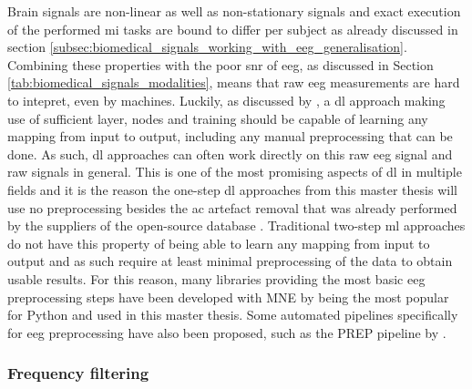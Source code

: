 Brain signals are non-linear as well as non-stationary signals and exact execution of the performed \gls{mi} tasks are bound to differ per subject as already discussed in section \ref{subsec:biomedical_signals_working_with_eeg_generalisation}.
Combining these properties with the poor \gls{snr} of \gls{eeg}, as discussed in Section \ref{tab:biomedical_signals_modalities}, means that raw \gls{eeg} measurements are hard to intepret, even by machines.
Luckily, as discussed by \citet{bci_review_arnau}, a \gls{dl} approach making use of sufficient layer, nodes and training should be capable of learning any mapping from input to output, including any manual preprocessing that can be done.
As such, \gls{dl} approaches can often work directly on this raw \gls{eeg} signal and raw signals in general.
This is one of the most promising aspects of \gls{dl} in multiple fields and it is the reason the one-step \gls{dl} approaches from this master thesis will use no preprocessing besides the \gls{ac} artefact removal that was already performed by the suppliers of the open-source database \citep{eeg_data}.
Traditional two-step \gls{ml} approaches do not have this property of being able to learn any mapping from input to output and as such require at least minimal preprocessing of the data to obtain usable results.
For this reason, many libraries providing the most basic \gls{eeg} preprocessing steps have been developed with MNE by \citet{mne} being the most popular for Python and used in this master thesis.
Some automated pipelines specifically for \gls{eeg} preprocessing have also been proposed, such as the PREP pipeline by \citet{prep_pipeline}. 


\subsubsection{Frequency filtering}
\label{subsubsec:processing_signals_general_pipeline_preprocessing_filter}

